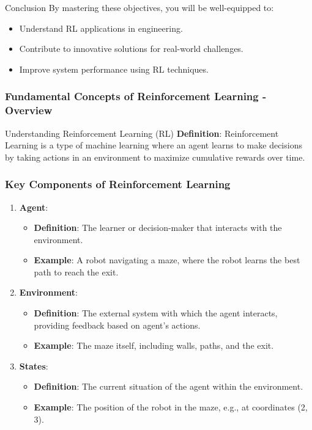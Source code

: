 \documentclass[aspectratio=169]{beamer}
\begin{document}
\begin{frame}[fragile]{Conclusion}
    By mastering these objectives, you will be well-equipped to:
    \begin{itemize}
        \item Understand RL applications in engineering.
        \item Contribute to innovative solutions for real-world challenges.
        \item Improve system performance using RL techniques.
    \end{itemize}
\end{frame}

\begin{frame}[fragile]
  \frametitle{Fundamental Concepts of Reinforcement Learning - Overview}
  \begin{block}{Understanding Reinforcement Learning (RL)}
    \textbf{Definition}: Reinforcement Learning is a type of machine learning where an agent learns to make decisions by taking actions in an environment to maximize cumulative rewards over time.
  \end{block}
\end{frame}

\begin{frame}[fragile]
  \frametitle{Key Components of Reinforcement Learning}
  \begin{enumerate}
    \item \textbf{Agent}:
      \begin{itemize}
        \item \textbf{Definition}: The learner or decision-maker that interacts with the environment.
        \item \textbf{Example}: A robot navigating a maze, where the robot learns the best path to reach the exit.
      \end{itemize}
      
    \item \textbf{Environment}:
      \begin{itemize}
        \item \textbf{Definition}: The external system with which the agent interacts, providing feedback based on agent’s actions.
        \item \textbf{Example}: The maze itself, including walls, paths, and the exit.
      \end{itemize}

    \item \textbf{States}:
      \begin{itemize}
        \item \textbf{Definition}: The current situation of the agent within the environment.
        \item \textbf{Example}: The position of the robot in the maze, e.g., at coordinates (2, 3).
      \end{itemize}
  \end{enumerate}
\end{frame}
\end{document}
